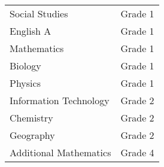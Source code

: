 \documentclass[10pt,a4paper]{altacv}
\begin{document}
\medskip
\begin{tabular}{ l c }
Social Studies & Grade 1\\
English A & Grade 1\\
Mathematics & Grade 1\\
Biology & Grade 1\\
Physics & Grade 1\\
Information Technology &  Grade 2\\
Chemistry & Grade 2\\
Geography & Grade 2\\
Additional Mathematics & Grade 4\\

\end{tabular}



\end{document}
